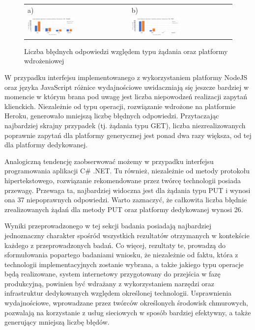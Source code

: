 \begin{figure}[htb]
  \centering
	\begin{tabular}{@{}ll@{}}
    a) & b) \\
    \includegraphics[width=0.49\textwidth]{rys05/nodejs-errors.pdf} & \includegraphics[width=0.49\textwidth]{rys05/dotnet-errors.pdf} \\
	\end{tabular}
  \caption{Liczba błędnych odpowiedzi względem typu żądania oraz platformy wdrożeniowej}
  \label{fig:errors-for-plaforms}
\end{figure}


W przypadku interfejsu implementowanego z wykorzystaniem platformy NodeJS oraz języka JavaScript różnice wydajnościowe uwidaczniają się jeszcze bardziej w momencie w którym brana pod uwagę jest liczba niepowodzeń realizacji zapytań klienckich. Niezależnie od typu operacji, rozwiązanie wdrożone na platformie Heroku, generowało mniejszą liczbę błędnych odpowiedzi. Przytaczając najbardziej skrajny przypadek (tj. żądania typu GET), liczba niezrealizowanych poprawnie zapytań dla platformy generycznej jest ponad dwa razy większa, od tej dla platformy dedykowanej.

Analogiczną tendencję zaobserwować możemy w przypadku interfejsu programowania aplikacji C\# .NET. Tu również, niezależnie od metody protokołu hipertekstowego, rozwiązanie rekomendowane przez twórcę technologii posiada przewagę. Przewaga ta, najbardziej widoczna jest dla żądania typu PUT i wynosi ona 37 niepoprawnych odpowiedzi. Warto zaznaczyć, że całkowita liczba błędnie zrealizowanych żądań dla metody PUT oraz platformy dedykowanej wynosi 26.

Wyniki przeprowadzonego w tej sekcji badania posiadają najbardziej jednoznaczny charakter spośród wszystkich rezultatów otrzymanych w kontekście każdego z przeprowadzonych badań. Co więcej, rezultaty te, prowadzą do sformułowania popartego badaniami wniosku, że niezależnie od faktu, która z technologii implementacyjnych zostanie wybrana, a także jakiego typu operacje będą realizowane, system internetowy przygotowany do przejścia w fazę produkcyjną, powinien być wdrażany z wykorzystaniem narzędzi oraz infrastruktur dedykowanych względem określonej technologii. Usprawnienia wydajnościowe, wprowadzane przez twórców określonych środowisk chmurowych, pozwalają na korzystanie z usług sieciowych w sposób bardziej efektywny, a także generujący mniejszą liczbę błędów.  
